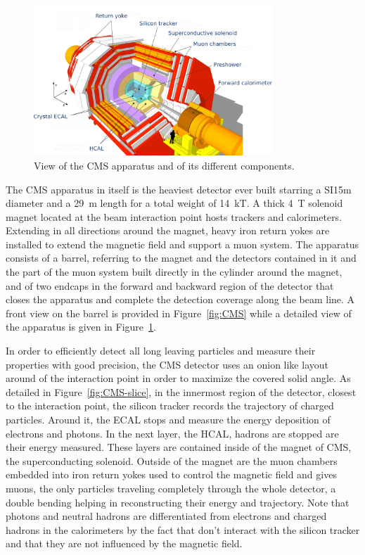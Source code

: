 	\begin{figure}[H]
		\centering
		\includegraphics[width=0.8\textwidth]{fig/chapt2/CMS_detail.pdf}
		\caption{\label{fig:CMS-detail} View of the CMS apparatus and of its different components.}
	\end{figure}
	
	The CMS apparatus in itself is the heaviest detector ever built starring a SI{15}{m} diameter and a \SI{29}{m} length for a total weight of \SI{14}{kT}. A thick \SI{4}{T} solenoid magnet located at the beam interaction point hosts trackers and calorimeters. Extending in all directions around the magnet, heavy iron return yokes are installed to extend the magnetic field and support a muon system. The apparatus consists of a barrel, referring to the magnet and the detectors contained in it and the part of the muon system built directly in the cylinder around the magnet, and of two endcaps in the forward and backward region of the detector that closes the apparatus and complete the detection coverage along the beam line. A front view on the barrel is provided in Figure~\ref{fig:CMS} while a detailed view of the apparatus is given in Figure~\ref{fig:CMS-detail}.
	
	In order to efficiently detect all long leaving particles and measure their properties with good precision, the CMS detector uses an onion like layout around of the interaction point in order to maximize the covered solid angle. As detailed in Figure~\ref{fig:CMS-slice}, in the innermost region of the detector, closest to the interaction point, the silicon tracker records the trajectory of charged particles. Around it, the \acf{ECAL} stops and measure the energy deposition of electrons and photons. In the next layer, the \acf{HCAL}, hadrons are stopped are their energy measured. These layers are contained inside of the magnet of CMS, the superconducting solenoid. Outside of the magnet are the muon chambers embedded into iron return yokes used to control the magnetic field and gives muons, the only particles traveling completely through the whole detector, a double bending helping in reconstructing their energy and trajectory. Note that photons and neutral hadrons are differentiated from electrons and charged hadrons in the calorimeters by the fact that don't interact with the silicon tracker and that they are not influenced by the magnetic field.
	
